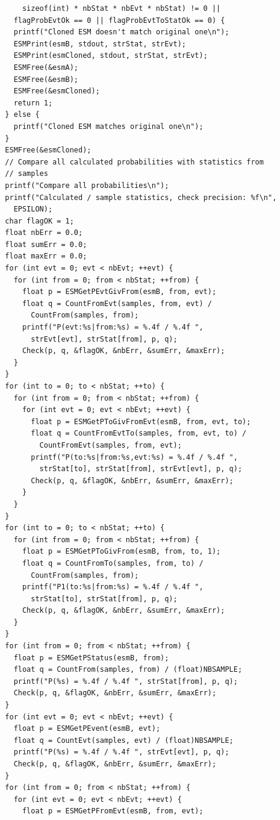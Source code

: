 \documentclass[12pt, a4paper]{article}
\begin{document}
\begin{scriptsize}
\begin{ttfamily}
\begin{lstlisting}
      sizeof(int) * nbStat * nbEvt * nbStat) != 0 ||
    flagProbEvtOk == 0 || flagProbEvtToStatOk == 0) {
    printf("Cloned ESM doesn't match original one\n");
    ESMPrint(esmB, stdout, strStat, strEvt);
    ESMPrint(esmCloned, stdout, strStat, strEvt);
    ESMFree(&esmA);
    ESMFree(&esmB);
    ESMFree(&esmCloned);
    return 1;
  } else {
    printf("Cloned ESM matches original one\n");
  }
  ESMFree(&esmCloned);  
  // Compare all calculated probabilities with statistics from
  // samples
  printf("Compare all probabilities\n");
  printf("Calculated / sample statistics, check precision: %f\n",
    EPSILON);
  char flagOK = 1;
  float nbErr = 0.0;
  float sumErr = 0.0;
  float maxErr = 0.0;
  for (int evt = 0; evt < nbEvt; ++evt) {
    for (int from = 0; from < nbStat; ++from) {
      float p = ESMGetPEvtGivFrom(esmB, from, evt);
      float q = CountFromEvt(samples, from, evt) / 
        CountFrom(samples, from);
      printf("P(evt:%s|from:%s) = %.4f / %.4f ", 
        strEvt[evt], strStat[from], p, q);
      Check(p, q, &flagOK, &nbErr, &sumErr, &maxErr);
    }
  }
  for (int to = 0; to < nbStat; ++to) {
    for (int from = 0; from < nbStat; ++from) {
      for (int evt = 0; evt < nbEvt; ++evt) {
        float p = ESMGetPToGivFromEvt(esmB, from, evt, to);
        float q = CountFromEvtTo(samples, from, evt, to) / 
          CountFromEvt(samples, from, evt);
        printf("P(to:%s|from:%s,evt:%s) = %.4f / %.4f ", 
          strStat[to], strStat[from], strEvt[evt], p, q);
        Check(p, q, &flagOK, &nbErr, &sumErr, &maxErr);
      }
    }
  }
  for (int to = 0; to < nbStat; ++to) {
    for (int from = 0; from < nbStat; ++from) {
      float p = ESMGetPToGivFrom(esmB, from, to, 1);
      float q = CountFromTo(samples, from, to) / 
        CountFrom(samples, from);
      printf("P1(to:%s|from:%s) = %.4f / %.4f ", 
        strStat[to], strStat[from], p, q);
      Check(p, q, &flagOK, &nbErr, &sumErr, &maxErr);
    }
  }
  for (int from = 0; from < nbStat; ++from) {
    float p = ESMGetPStatus(esmB, from);
    float q = CountFrom(samples, from) / (float)NBSAMPLE;
    printf("P(%s) = %.4f / %.4f ", strStat[from], p, q);
    Check(p, q, &flagOK, &nbErr, &sumErr, &maxErr);
  }
  for (int evt = 0; evt < nbEvt; ++evt) {
    float p = ESMGetPEvent(esmB, evt);
    float q = CountEvt(samples, evt) / (float)NBSAMPLE;
    printf("P(%s) = %.4f / %.4f ", strEvt[evt], p, q);
    Check(p, q, &flagOK, &nbErr, &sumErr, &maxErr);
  }
  for (int from = 0; from < nbStat; ++from) {
    for (int evt = 0; evt < nbEvt; ++evt) {
      float p = ESMGetPFromEvt(esmB, from, evt);

\end{lstlisting}
\end{ttfamily}
\end{scriptsize}
\end{document}
